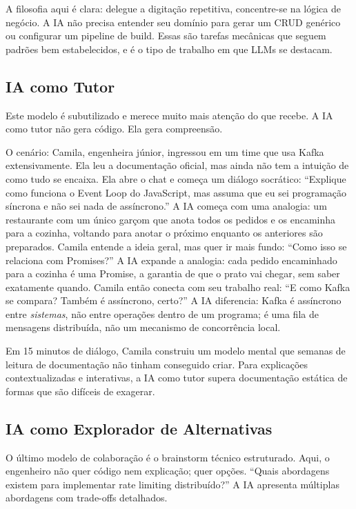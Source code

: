 A filosofia aqui é clara: delegue a digitação repetitiva, concentre-se na lógica de
negócio. A IA não precisa entender seu domínio para gerar um CRUD genérico ou
configurar um pipeline de build. Essas são tarefas mecânicas que seguem padrões
bem estabelecidos, e é o tipo de trabalho em que LLMs se destacam.

\subsection{IA como Tutor}

Este modelo é subutilizado e merece muito mais atenção do que recebe. A IA como
tutor não gera código. Ela gera compreensão.

O cenário: Camila, engenheira júnior, ingressou em um time que usa Kafka extensivamente.
Ela leu a documentação oficial, mas ainda não tem a intuição de como tudo se encaixa.
Ela abre o chat e começa um diálogo socrático: ``Explique como funciona o Event Loop do
JavaScript, mas assuma que eu sei programação síncrona e não sei nada de assíncrono.''
A IA começa com uma analogia: um restaurante com um único garçom que anota todos os
pedidos e os encaminha para a cozinha, voltando para anotar o próximo enquanto os
anteriores são preparados. Camila entende a ideia geral, mas quer ir mais fundo:
``Como isso se relaciona com Promises?'' A IA expande a analogia: cada pedido
encaminhado para a cozinha é uma Promise, a garantia de que o prato vai chegar, sem
saber exatamente quando. Camila então conecta com seu trabalho real: ``E como Kafka se
compara? Também é assíncrono, certo?'' A IA diferencia: Kafka é assíncrono entre
\textit{sistemas}, não entre operações dentro de um programa; é uma fila de mensagens
distribuída, não um mecanismo de concorrência local.

Em 15 minutos de diálogo, Camila construiu um modelo mental que semanas de leitura
de documentação não tinham conseguido criar. Para explicações contextualizadas e
interativas, a IA como tutor supera documentação estática de formas que são difíceis
de exagerar.

\subsection{IA como Explorador de Alternativas}

O último modelo de colaboração é o brainstorm técnico estruturado. Aqui, o engenheiro
não quer código nem explicação; quer opções. ``Quais abordagens existem para
implementar rate limiting distribuído?'' A IA apresenta múltiplas abordagens
com trade-offs detalhados.


